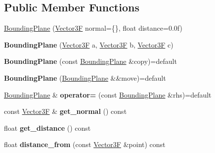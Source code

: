 \subsection*{Public Member Functions}
\begin{DoxyCompactItemize}
\item 
\mbox{\hyperlink{class_bounding_plane_ad25000eaea20874698ae4b40bb84fb41}{Bounding\+Plane}} (\mbox{\hyperlink{class_vector3}{Vector3F}} normal=\{\}, float distance=0.\+0f)
\item 
\mbox{\label{class_bounding_plane_a24495ff7c5819bb37af4e971a077b7dd}} 
{\bfseries Bounding\+Plane} (\mbox{\hyperlink{class_vector3}{Vector3F}} a, \mbox{\hyperlink{class_vector3}{Vector3F}} b, \mbox{\hyperlink{class_vector3}{Vector3F}} c)
\item 
\mbox{\label{class_bounding_plane_a007cc683824c23bc818b2f3584ce5386}} 
{\bfseries Bounding\+Plane} (const \mbox{\hyperlink{class_bounding_plane}{Bounding\+Plane}} \&copy)=default
\item 
\mbox{\label{class_bounding_plane_af1db7dfae2ab49d62f73eb7db3f39e29}} 
{\bfseries Bounding\+Plane} (\mbox{\hyperlink{class_bounding_plane}{Bounding\+Plane}} \&\&move)=default
\item 
\mbox{\label{class_bounding_plane_adbb48a97748ef40bb761a2018f1d2473}} 
\mbox{\hyperlink{class_bounding_plane}{Bounding\+Plane}} \& {\bfseries operator=} (const \mbox{\hyperlink{class_bounding_plane}{Bounding\+Plane}} \&rhs)=default
\item 
\mbox{\label{class_bounding_plane_a7c656534126a09de2768bffe9cdc5964}} 
const \mbox{\hyperlink{class_vector3}{Vector3F}} \& {\bfseries get\+\_\+normal} () const
\item 
\mbox{\label{class_bounding_plane_ac34d406c0f223d599a7b7aad49d4cb54}} 
float {\bfseries get\+\_\+distance} () const
\item 
\mbox{\label{class_bounding_plane_aae737d55629287d1f9f2598c8f81c09c}} 
float {\bfseries distance\+\_\+from} (const \mbox{\hyperlink{class_vector3}{Vector3F}} \&point) const
\item 

\end{DoxyCompactItemize}
